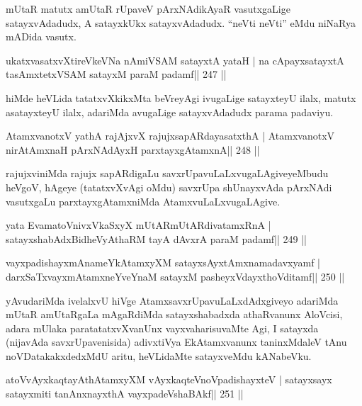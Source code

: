 \begin{artha}
mUtaR matutx amUtaR rUpaveV pArxNAdikAyaR vasutxgaLige satayxvAdadudx,
A satayxkUkx satayxvAdadudx. ``neVti neVti'' eMdu niNaRya mADida vasutx.
\end{artha}


\begin{shl}
ukatxvasatxvXtireVkeVNa nAmiVSAM satayxtA yataH |
na cApayxsatayxtA tasAmxtetxVSAM satayxM paraM padamf\hfill || 247 ||
\end{shl}

\begin{artha}
hiMde heVLida tatatxvXkikxMta beVreyAgi ivugaLige satayxteyU ilalx, matutx asatayxteyU ilalx, adariMda avugaLige satayxvAdadudx parama padaviyu.
\end{artha}

\begin{shl}
AtamxvanotxV yathA rajAjxvX rajujxsapARdayasatxthA |
AtamxvanotxV nirAtAmxnaH pArxNAdAyxH parxtayxgAtamxnA\hfill || 248 ||
\end{shl}

\begin{artha}
rajujxviniMda rajujx sapARdigaLu savxrUpavuLaLxvugaLAgiveyeMbudu  heVgoV, hAgeye (tatatxvXvAgi oMdu) savxrUpa shUnayxvAda pArxNAdi vasutxgaLu parxtayxgAtamxniMda AtamxvuLaLxvugaLAgive.
\end{artha}

\begin{shl}
yata EvamatoV\s nivxVkaSxyX mUtARmUtARdivatamxRnA |
satayxshabAdxBidheVyAthaRM tayA dAvxrA paraM padamf\hfill || 249 ||
\end{shl}

\begin{shl}
vayxpadishayxmAnameYkAtamxyXM satayxsAyx\s\s tAmxnamadavxyamf |
darxSaTxvayxmAtamxneYveYnaM satayxM pasheyxVdayxthoVditamf\hfill || 250 ||
\end{shl}

\begin{artha}
yAvudariMda ivelalxvU hiVge AtamxsavxrUpavuLaLxdAdxgiveyo adariMda mUtaR amUtaRgaLa mAgaRdiMda satayxshabadxda athaRvanunx AloVcisi, adara mUlaka paratatatxvXvanUnx vayxvaharisuvaMte Agi, I satayxda (nijavAda savxrUpavenisida) adivxtiVya EkAtamxvanunx taninxMdaleV tAnu noVDatakakxdedxMdU aritu, heVLidaMte satayxveMdu kANabeVku.
\end{artha}

\begin{shl}
atoV\s vAyxkaqtayAthAtamxyXM vAyxkaqteVnoVpadishayxteV |
satayxsayx satayxmiti tanAnxnayxthA vayxpadeVshaBAkf\hfill || 251 ||
\end{shl}

